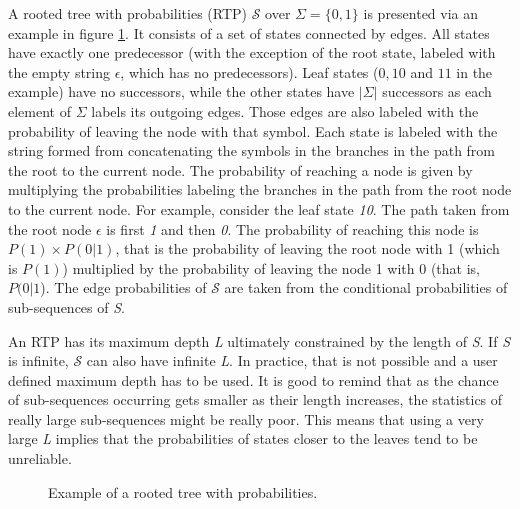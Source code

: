 {A rooted tree with probabilities (RTP) $\mathcal{S}$ over $\Sigma = \{0, 1\}$ is presented via an example in figure \ref{fig:rtp}. It consists of a set of states connected by edges. All states have exactly one predecessor (with the exception of the root state, labeled with the empty string $\epsilon$, which has no predecessors). Leaf states ($0, 10$ and $11$ in the example) have no successors, while the other states have $|\Sigma|$ successors as each element of $\Sigma$ labels its outgoing edges. Those edges are also labeled with the probability of leaving the node with that symbol. Each state is labeled with the string formed from concatenating the symbols in the branches in the path from the root to the current node. The probability of reaching a node is given by multiplying the probabilities labeling the branches in the path from the root node to the current node. For example, consider the leaf state \textit{10}. The path taken from the root node $\epsilon$ is first \textit{1} and then \textit{0}. The probability of reaching this node is $P(1)\times P(0|1)$, that is the probability of leaving the root node with 1 (which is $P(1)$) multiplied by the probability of leaving the node 1 with 0 (that is, $P(0|1$). The edge probabilities of $\mathcal{S}$ are taken from the conditional probabilities of sub-sequences of \textit{S}.

An RTP has its maximum depth \textit{L} ultimately constrained by the length of \textit{S}. If \textit{S} is infinite, $\mathcal{S}$ can also have infinite \textit{L}. In practice, that is not possible and a user defined maximum depth has to be used. It is good to remind that as the chance of sub-sequences occurring gets smaller as their length increases, the statistics of really large sub-sequences might be really poor. This means that using a very large \textit{L} implies that the probabilities of states closer to the leaves tend to be unreliable.

\begin{figure}[h]
\centering
{}
\caption{Example of a rooted tree with probabilities. \label{fig:rtp}}
\end{figure}
 
}
